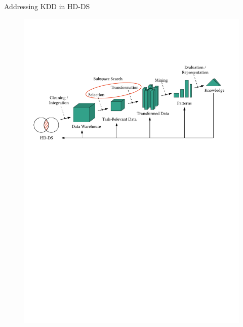 \documentclass[16pt,usenames,dvipsnames, notheorems]{beamer}
\theoremstyle{definition}
\theoremstyle{example}
\theoremstyle{plain}
\begin{document}
\begin{frame}{Addressing KDD in HD-DS}
\begin{figure}
\begin{overprint}
		 \includegraphics[width=\linewidth]{figures/kdd_bis_2-compressed.pdf}

\end{overprint}
\end{figure}
\end{frame}
\end{document}

